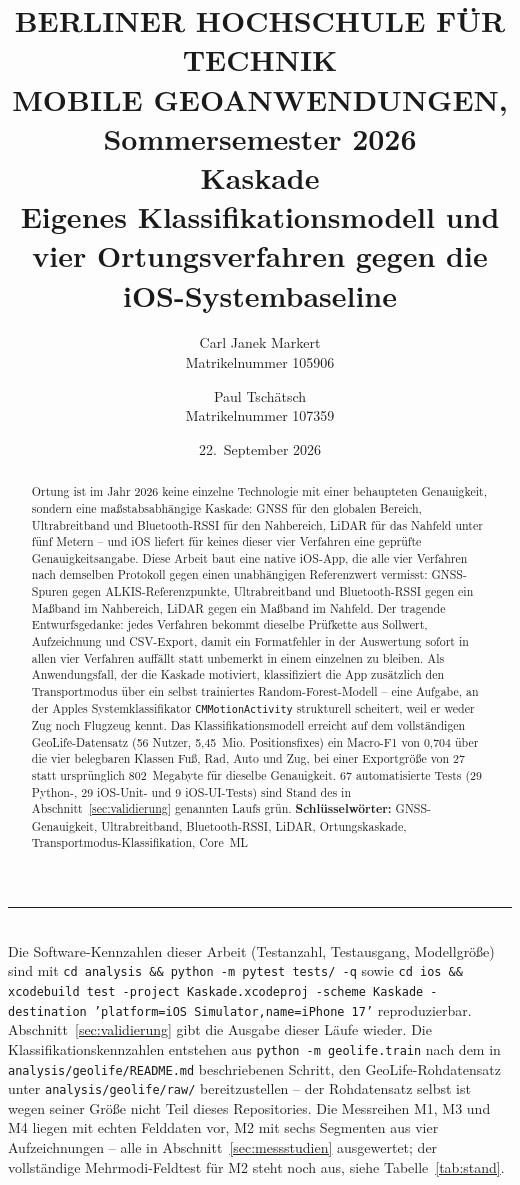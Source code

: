 \documentclass[11pt,a4paper,oneside]{article}
\title{%
    {\normalsize BERLINER HOCHSCHULE FÜR TECHNIK\\[0.2em]}
    {\small MOBILE GEOANWENDUNGEN, Sommersemester 2026\\[1.4em]}
    \textbf{Kaskade}\\[0.4em]
    \large Eigenes Klassifikationsmodell und vier Ortungsverfahren gegen die iOS-Systembaseline%
}
\author{%
    Carl Janek Markert\\[0.2em]
    {\normalsize Matrikelnummer 105906}
    \and
    Paul Tschätsch\\[0.2em]
    {\normalsize Matrikelnummer 107359}%
}
\date{22.~September 2026}
\begin{document}
\maketitle
\thispagestyle{fancy}

\begin{abstract}
\noindent
Ortung ist im Jahr 2026 keine einzelne Technologie mit einer behaupteten
Genauigkeit, sondern eine maßstabsabhängige Kaskade: GNSS für den globalen
Bereich, Ultrabreitband und Bluetooth-RSSI für den Nahbereich, LiDAR für
das Nahfeld unter fünf Metern -- und iOS liefert für keines dieser vier
Verfahren eine geprüfte Genauigkeitsangabe. Diese Arbeit baut eine native
iOS-App, die alle vier Verfahren nach demselben Protokoll gegen einen
unabhängigen Referenzwert vermisst: GNSS-Spuren gegen ALKIS-Referenzpunkte,
Ultrabreitband und Bluetooth-RSSI gegen ein Maßband im Nahbereich, LiDAR
gegen ein Maßband im Nahfeld. Der tragende Entwurfsgedanke: jedes Verfahren
bekommt dieselbe Prüfkette aus Sollwert, Aufzeichnung und CSV-Export, damit
ein Formatfehler in der Auswertung sofort in allen vier Verfahren auffällt
statt unbemerkt in einem einzelnen zu bleiben. Als Anwendungsfall, der die
Kaskade motiviert, klassifiziert die App zusätzlich den Transportmodus über
ein selbst trainiertes Random-Forest-Modell -- eine Aufgabe, an der Apples
Systemklassifikator \texttt{CMMotionActivity} strukturell scheitert, weil
er weder Zug noch Flugzeug kennt. Das Klassifikationsmodell erreicht auf dem
vollständigen
GeoLife-Datensatz (56 Nutzer, 5,45~Mio. Positionsfixes) ein Macro-F1 von
0,704 über die vier belegbaren Klassen Fuß, Rad, Auto und Zug, bei einer
Exportgröße von 27 statt ursprünglich 802~Megabyte für dieselbe Genauigkeit.
67 automatisierte Tests (29 Python-, 29 iOS-Unit- und 9 iOS-UI-Tests) sind
Stand des in Abschnitt~\ref{sec:validierung} genannten Laufs grün.
\medskip
\noindent\textbf{Schlüsselwörter:} GNSS-Genauigkeit, Ultrabreitband,
Bluetooth-RSSI, LiDAR, Ortungskaskade, Transportmodus-Klassifikation,
Core~ML
\end{abstract}

\vfill
\noindent\rule{\linewidth}{0.4pt}\\
{\small Die Software-Kennzahlen dieser Arbeit (Testanzahl, Testausgang,
Modellgröße) sind mit \texttt{cd analysis \&\& python -m pytest tests/ -q}
sowie \texttt{cd ios \&\& xcodebuild test -project Kaskade.xcodeproj
-scheme Kaskade -destination 'platform=iOS Simulator,name=iPhone 17'}
reproduzierbar. Abschnitt~\ref{sec:validierung} gibt die Ausgabe dieser
Läufe wieder. Die Klassifikationskennzahlen entstehen aus
\texttt{python -m geolife.train} nach dem in
\texttt{analysis/geolife/README.md} beschriebenen Schritt, den
GeoLife-Rohdatensatz unter \texttt{analysis/geolife/raw/} bereitzustellen --
der Rohdatensatz selbst ist wegen seiner Größe nicht Teil dieses
Repositories. Die Messreihen M1, M3 und M4 liegen mit echten Felddaten vor,
M2 mit sechs Segmenten aus vier Aufzeichnungen -- alle in
Abschnitt~\ref{sec:messstudien} ausgewertet; der vollständige
Mehrmodi-Feldtest für M2 steht noch aus, siehe Tabelle~\ref{tab:stand}.}
\end{document}
